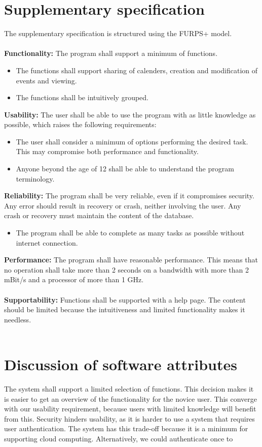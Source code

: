 \documentclass[a4paper,10pt,titlepage]{article}
\begin{document}
\section{Supplementary specification}
	The supplementary specification is structured using the FURPS+ model.
	\\ \\
	\textbf{Functionality:}
	The program shall support a minimum of functions.
	\begin{itemize}
	\item The functions shall support sharing of calenders, creation and modification of events and viewing.
	\item The functions shall be intuitively grouped.
	\\
	\end{itemize}
	\textbf{Usability:}
	The user shall be able to use the program with as little knowledge as possible, which raises the following requirements:
	\begin{itemize}
	\item The user shall consider a minimum of options performing the desired task. This may compromise both performance and functionality.
	\item Anyone beyond the age of 12 shall be able to understand the program terminology. 
	\\
	\end{itemize}
	\textbf{Reliability:}
	The program shall be very reliable, even if it compromises security. Any error should result in recovery or crash, neither involving the user. Any crash or recovery must maintain the content of the database.
	\begin{itemize}
	\item The program shall be able to complete as many tasks as possible without internet connection.
	\\
	\end{itemize}
	\textbf{Performance:}
	The program shall have reasonable performance. This means that no operation shall take more than 2 seconds on a bandwidth with more than 2 mBit/s and a processor of more than 1 GHz.
	\\ \\
	\textbf{Supportability:}
	Functions shall be supported with a help page. The content should be limited because the intuitiveness and limited functionality makes it needless.
	\\ \\
\section{Discussion of software attributes}
	The system shall support a limited selection of functions. This decision makes it is easier to get an overview of the functionality for the novice user. This converge with our usability requirement, because users with limited knowledge will benefit from this. Security hinders usability, as it is harder to use a system that requires user authentication. The system has this trade-off because it is a minimum for supporting cloud computing. Alternatively, we could authenticate once to  
\end{document}
